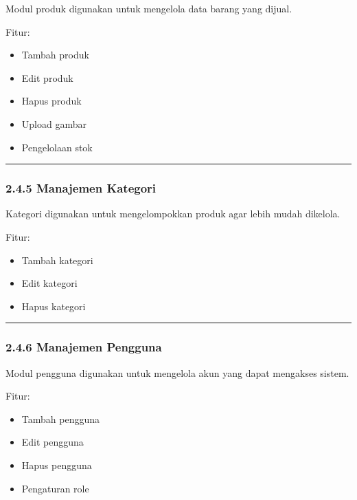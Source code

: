 Modul produk digunakan untuk mengelola data barang yang dijual.

Fitur:

\begin{itemize}
\tightlist
\item
  Tambah produk
\item
  Edit produk
\item
  Hapus produk
\item
  Upload gambar
\item
  Pengelolaan stok
\end{itemize}

\begin{center}\rule{0.5\linewidth}{0.5pt}\end{center}

\subsubsection{2.4.5 Manajemen Kategori}\label{manajemen-kategori}

Kategori digunakan untuk mengelompokkan produk agar lebih mudah dikelola.

Fitur:

\begin{itemize}
\tightlist
\item
  Tambah kategori
\item
  Edit kategori
\item
  Hapus kategori
\end{itemize}

\begin{center}\rule{0.5\linewidth}{0.5pt}\end{center}

\subsubsection{2.4.6 Manajemen Pengguna}\label{manajemen-pengguna}

Modul pengguna digunakan untuk mengelola akun yang dapat mengakses sistem.

Fitur:

\begin{itemize}
\tightlist
\item
  Tambah pengguna
\item
  Edit pengguna
\item
  Hapus pengguna
\item
  Pengaturan role
\end{itemize}

